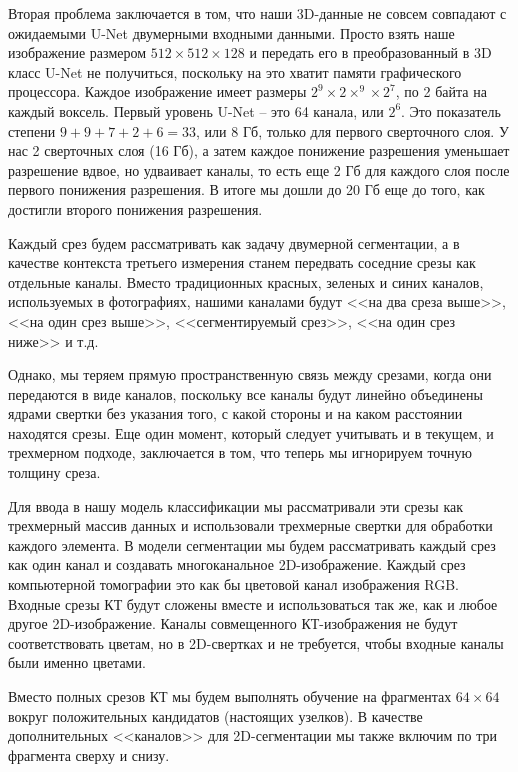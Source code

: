 \documentclass[%
	11pt,
	a4paper,
	utf8,
		]{article}
\begin{document}
Вторая проблема заключается в том, что наши 3D-данные не совсем совпадают с ожидаемыми U-Net двумерными входными данными. Просто взять наше изображение размером $512 \times 512 \times 128$ и передать его в преобразованный в 3D класс U-Net не получиться, поскольку на это хватит памяти графического процессора. Каждое изображение имеет размеры $2^9 \times 2 \times ^9 \times 2^7$, по 2 байта на каждый воксель. Первый уровень U-Net -- это 64 канала, или $2^6$. Это показатель степени $9 + 9 + 7 + 2 + 6 = 33$, или 8 Гб, только для первого сверточного слоя. У нас 2 сверточных слоя (16 Гб), а затем каждое понижение разрешения уменьшает разрешение вдвое, но удваивает каналы, то есть еще 2 Гб для каждого слоя после первого понижения разрешения. В итоге мы дошли до 20 Гб еще до того, как достигли второго понижения разрешения.

Каждый срез будем рассматривать как задачу двумерной сегментации, а в качестве контекста третьего измерения станем передвать соседние срезы как отдельные каналы. Вместо традиционных красных, зеленых и синих каналов, используемых в фотографиях, нашими каналами будут <<на два среза выше>>, <<на один срез выше>>, <<сегментируемый срез>>, <<на один срез ниже>> и т.д. \cite[]{pytorch-2022}

Однако, мы теряем прямую пространственную связь между срезами, когда они передаются в виде каналов, поскольку все каналы будут линейно объединены ядрами свертки без указания того, с какой стороны и на каком расстоянии находятся срезы. Еще один момент, который следует учитывать и в текущем, и трехмерном подходе, заключается в том, что теперь мы игнорируем точную толщину среза. 

Для ввода в нашу модель классификации мы рассматривали эти срезы как трехмерный массив данных и использовали трехмерные свертки для обработки каждого элемента. В модели сегментации мы будем рассматривать каждый срез как один канал и создавать многоканальное 2D-изображение. Каждый срез компьютерной томографии это как бы цветовой канал изображения RGB. Входные срезы КТ будут сложены вместе и использоваться так же, как и любое другое 2D-изображение. Каналы совмещенного КТ-изображения не будут соответствовать цветам, но в 2D-свертках и не требуется, чтобы входные каналы были именно цветами.

Вместо полных срезов КТ мы будем выполнять обучение на фрагментах $64 \times 64$ вокруг положительных кандидатов (настоящих узелков). В качестве дополнительных <<каналов>> для 2D-сегментации мы также включим по три фрагмента сверху и снизу.
\end{document}
